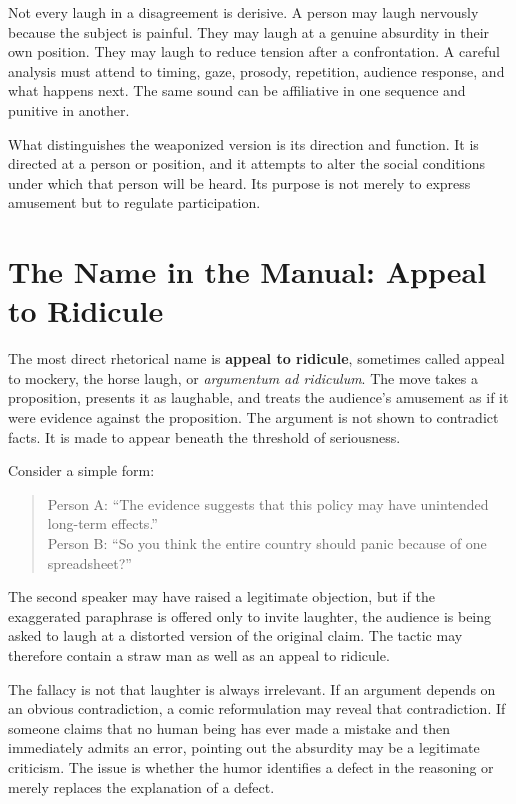 ﻿\documentclass[12pt,a4paper]{book}
\begin{document}
Not every laugh in a disagreement is derisive. A person may laugh nervously because the subject is painful. They may laugh at a genuine absurdity in their own position. They may laugh to reduce tension after a confrontation. A careful analysis must attend to timing, gaze, prosody, repetition, audience response, and what happens next. The same sound can be affiliative in one sequence and punitive in another.

What distinguishes the weaponized version is its direction and function. It is directed at a person or position, and it attempts to alter the social conditions under which that person will be heard. Its purpose is not merely to express amusement but to regulate participation.

\section{The Name in the Manual: Appeal to Ridicule}

The most direct rhetorical name is \textbf{appeal to ridicule}, sometimes called appeal to mockery, the horse laugh, or \emph{argumentum ad ridiculum}. The move takes a proposition, presents it as laughable, and treats the audience's amusement as if it were evidence against the proposition. The argument is not shown to contradict facts. It is made to appear beneath the threshold of seriousness.

Consider a simple form:

\begin{quote}
Person A: ``The evidence suggests that this policy may have unintended long-term effects.''\\
Person B: ``So you think the entire country should panic because of one spreadsheet?''
\end{quote}

The second speaker may have raised a legitimate objection, but if the exaggerated paraphrase is offered only to invite laughter, the audience is being asked to laugh at a distorted version of the original claim. The tactic may therefore contain a straw man as well as an appeal to ridicule.

The fallacy is not that laughter is always irrelevant. If an argument depends on an obvious contradiction, a comic reformulation may reveal that contradiction. If someone claims that no human being has ever made a mistake and then immediately admits an error, pointing out the absurdity may be a legitimate criticism. The issue is whether the humor identifies a defect in the reasoning or merely replaces the explanation of a defect.
\end{document}

